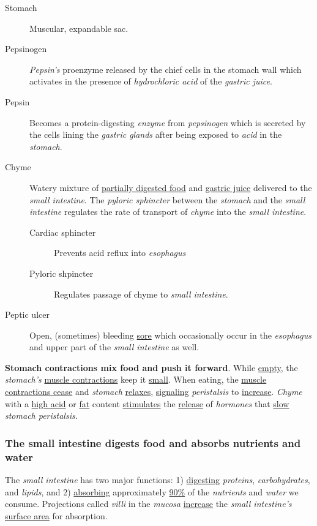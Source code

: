 \documentclass[11pt]{article}
\begin{document}
\begin{description}
\item[{Stomach}] Muscular, expandable sac.
\item[{Pepsinogen}] \emph{Pepsin's} proenzyme released by the chief cells in the stomach
wall which activates in the presence of \emph{hydrochloric acid} of the \emph{gastric
juice}.
\item[{Pepsin}] Becomes a protein-digesting \emph{enzyme} from \emph{pepsinogen} which is secreted
by the cells lining the \emph{gastric glands} after being exposed to \emph{acid} in the
\emph{stomach}.
\item[{Chyme}] Watery mixture of \uline{partially digested food} and \uline{gastric juice} delivered
to the \emph{small intestine}. The \emph{pyloric sphincter} between the \emph{stomach} and the
\emph{small intestine} regulates the rate of transport of \emph{chyme} into the \emph{small
intestine}.
\begin{description}
\item[{Cardiac sphincter}] Prevents acid reflux into \emph{esophagus}
\item[{Pyloric shpincter}] Regulates passage of chyme to \emph{small intestine}.
\end{description}
\item[{Peptic ulcer}] Open, (sometimes) bleeding \uline{sore} which occasionally occur in
the \emph{esophagus} and upper part of the \emph{small intestine} as well.
\end{description}


\textbf{Stomach contractions mix food and push it forward}. While \uline{empty}, the \emph{stomach's}
\uline{muscle contractions} keep it \uline{small}. When eating, the \uline{muscle contractions cease}
and \emph{stomach} \uline{relaxes}, \uline{signaling} \emph{peristalsis} to \uline{increase}. \emph{Chyme} with a \uline{high acid}
or \uline{fat} content \uline{stimulates} the \uline{release} of \emph{hormones} that \uline{slow} \emph{stomach peristalsis}.

\subsubsection{The small intestine digests food and absorbs nutrients and water}
\label{sec:orgae79584}
The \emph{small intestine} has two major functions: 1) \uline{digesting} \emph{proteins},
\emph{carbohydrates}, and \emph{lipids}, and 2) \uline{absorbing} approximately \uline{90\%} of the \emph{nutrients}
and \emph{water} we consume. Projections called \emph{villi} in the \emph{mucosa} \uline{increase} the \emph{small
intestine's} \uline{surface area} for absorption.
\end{document}
